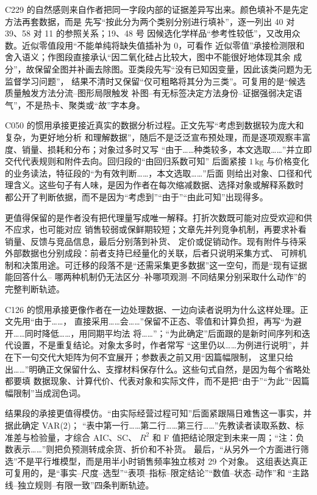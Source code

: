 C229 的自然感则来自作者把同一字段内部的证据差异写出来。颜色填补不是先定方法再套数据，而是
先写“按此分为两个类别分别进行填补”，逐一列出 40 对 39、58 对 11 的参照关系；19、48 号
因候选化学样品“参考性较低”，又改用众数。近似零值段用“不能单纯将缺失值插补为 0，可看作
近似零值”承接检测限和舍入语义；作图段直接承认“因二氧化硅占比较大，图中不能很好地体现其余
成分”，故保留全图并补画去除图。亚类段先写“没有已知因变量，因此该类问题为无监督学习问题”，
结果不清时又保留“仅可粗略将其分为三类”。可复用的是“候选质量触发方法分流--图形局限触发
补图--有无标签决定方法身份--证据强弱决定语气”，不是热卡、聚类或“故”字本身。

C050 的惯用承接更接近真实的数据分析过程。正文先写“考虑到数据较为庞大和复杂，为更好地分析
和理解数据”，随后不是泛泛宣布预处理，而是逐项观察丰富度、销量、损耗和分布；对象过多时又写
“由于……种类较多，本文选取……”并立即交代代表规则和附件去向。回归段的“由回归系数可知”
后面紧接 $1\,\mathrm{kg}$ 与价格变化的业务读法，特征段的“为有效判断……，本文选取……”后面
则给出对象、口径和代理含义。这些句子有人味，是因为作者在每次缩减数据、选择对象或解释系数时
都公开了判断依据，而不是因为“考虑到”“由于”“由此可知”出现得多。

更值得保留的是作者没有把代理量写成唯一解释。打折次数既可能对应受欢迎和供不应求，也可能对应
销售较弱或保鲜期较短；文章先并列竞争机制，再要求补看销量、反馈与竞品信息，最后分别落到补货、
定价或促销动作。现有附件与待采外部数据也分别成段：前者支持已经量化的关联，后者只说明采集方式、
可辨机制和决策用途。可迁移的段落不是“还需采集更多数据”这一空句，而是“现有证据能回答什么--
哪两种机制仍无法区分--补哪项观测--不同结果分别采取什么动作”的完整判断轨迹。

C126 的惯用承接更像作者在一边处理数据、一边向读者说明为什么这样处理。正文先用“由于……，
直接采用……会……”保留不正态、零值和计算负担，再写“为避开……同时降低……，用同期平均法
将……”；“为此确定”后面跟的是新时间序列和迭代设置，不是重复结论。对象太多时，作者常写
“这里仍以……为例进行说明”，并在下一句交代大矩阵为何不宜展开；参数表之前又用“因篇幅限制，
这里只给出……”明确正文保留什么、支撑材料保存什么。这些句式自然，是因为每个省略处都要填
数据现象、计算代价、代表对象和实际文件，而不是把“由于”“为此”“因篇幅限制”当成润色词。

结果段的承接更值得模仿。“由实际经营过程可知”后面紧跟隔日难售这一事实，并据此确定 VAR(2)；
“表中第一行……第二行……第三行……”先教读者读取系数、标准差与检验量，才综合 AIC、SC、
$R^2$ 和 F 值把结论限定到未来一周；“注：负数表示……”则把负预测转成余货、折价和不补货。
最后，“从另外一个方面进行筛选”不是平行堆模型，而是用半小时销售频率独立核对 29 个对象。
这组表达真正可复用的，是“事实--尺度--选型”“表项--指标--限定结论”“数值--状态--动作”和
“主路线--独立规则--有限一致”四条判断轨迹。

